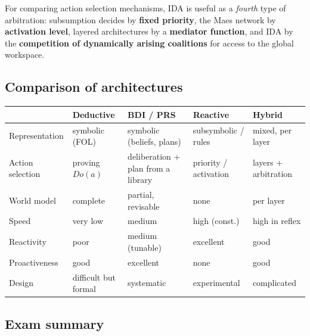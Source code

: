 \documentclass[11pt,a4paper]{article}
\theoremstyle{definition}
\begin{document}
For comparing action selection mechanisms, IDA is useful as a \emph{fourth} type of arbitration:
subsumption decides by \textbf{fixed priority}, the Maes network by \textbf{activation level},
layered architectures by a \textbf{mediator function}, and IDA by the \textbf{competition of
dynamically arising coalitions} for access to the global workspace.

\subsection{Comparison of architectures}

\begin{center}
\small
\begin{tabular}{@{}p{}
  >{\raggedright\arraybackslash}p{}
  >{\raggedright\arraybackslash}p{}
  >{\raggedright\arraybackslash}p{}
  >{\raggedright\arraybackslash}p{}@{}}
\toprule
& \textbf{Deductive} & \textbf{BDI / PRS} & \textbf{Reactive} & \textbf{Hybrid} \\
\midrule
Representation & symbolic (FOL) & symbolic (beliefs, plans) & subsymbolic / rules
  & mixed, per layer \\
Action selection & proving $\mathit{Do}(a)$ & deliberation + plan from a library
  & priority / activation & layers + arbitration \\
World model & complete & partial, revisable & none & per layer \\
Speed & very low & medium & high (const.) & high in reflex \\
Reactivity & poor & medium (tunable) & excellent & good \\
Proactiveness & good & excellent & none & good \\
Design & difficult but formal & systematic & experimental & complicated \\
\bottomrule
\end{tabular}
\end{center}

\subsection{Exam summary}
\end{document}
